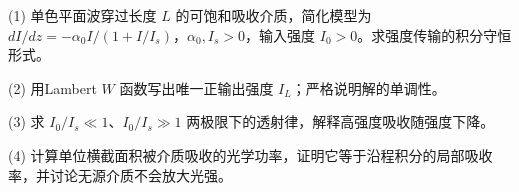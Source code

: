 (1) 单色平面波穿过长度 \(L\) 的可饱和吸收介质，简化模型为 \(dI/dz=-\alpha_0 I/(1+I/I_s)\)，\(\alpha_0,I_s>0\)，输入强度 \(I_0>0\)。求强度传输的积分守恒形式。

(2) 用Lambert \(W\) 函数写出唯一正输出强度 \(I_L\)；严格说明解的单调性。

(3) 求 \(I_0/I_s\ll1\)、\(I_0/I_s\gg1\) 两极限下的透射律，解释高强度吸收随强度下降。

(4) 计算单位横截面积被介质吸收的光学功率，证明它等于沿程积分的局部吸收率，并讨论无源介质不会放大光强。
